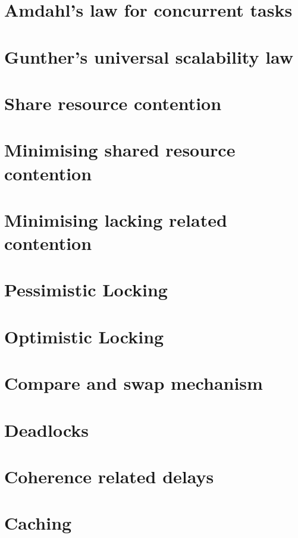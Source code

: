 \documentclass[11pt]{article}
\begin{document}
\section{Amdahl's law for concurrent tasks}

\section{Gunther's universal scalability law}

\section{Share resource contention}

\section{Minimising shared resource contention}

\section{Minimising lacking related contention}

\section{Pessimistic Locking}

\section{Optimistic Locking}

\section{Compare and swap mechanism}

\section{Deadlocks}

\section{Coherence related delays}

\section{Caching}
\end{document}
